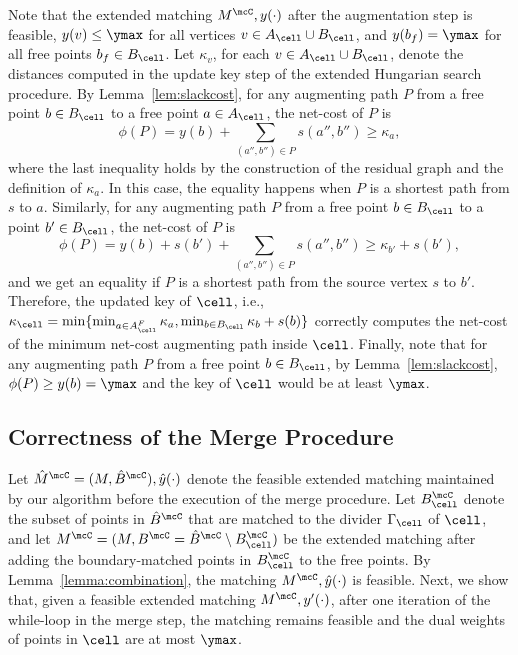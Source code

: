  Note that the extended matching $M^\mcC, y(\cdot)$ after the augmentation step is feasible, $y(v)\le \ymax$ for all vertices $v\in A_\cell\cup B_\cell$, and $y(b_f)=\ymax$ for all free points $b_f\in B_\cell$. Let $\kappa_v$, for each $v\in A_\cell\cup B_\cell$, denote the distances computed in the update key step of the extended Hungarian search procedure. By Lemma~\ref{lem:slackcost}, for any augmenting path $P$ from a free point $b\in B_\cell$ to a free point $a\in A_\cell$, the net-cost of $P$ is 
\[\phi(P)=y(b) +\sum_{(a'',b'')\in P}s(a'',b'') \ge \kappa_a,\] where the last inequality holds by the construction of the residual graph and the definition of $\kappa_a$. In this case, the equality happens when $P$ is a shortest path from $s$ to $a$. Similarly, for any augmenting path $P$ from a free point $b\in B_\cell$ to a point $b'\in B_\cell$, the net-cost of $P$ is 
\[\phi(P)=y(b) + s(b') +\sum_{(a'',b'')\in P}s(a'',b'') \ge \kappa_{b'} + s(b'),\]
and we get an equality if $P$ is a shortest path from the source vertex $s$ to $b'$.
Therefore, the updated key of $\cell$, i.e., $\kappa_\cell=\min\{\min_{a\in A_\cell^F}\kappa_a, \min_{b\in B_\cell}\kappa_b+s(b)\}$ correctly computes the net-cost of the minimum net-cost augmenting path inside $\cell$. Finally, note that for any augmenting path $P$ from a free point $b\in B_\cell$, by Lemma~\ref{lem:slackcost}, $\phi(P)\ge y(b)=\ymax$ and the key of $\cell$ would be at least $\ymax$.



\subsection{Correctness of the Merge Procedure}\label{subsec:merge_correctness}

\mergeProp*
Let $\hat{M}^\mcC=(M, \hat{B}^\mcC), \hat{y}(\cdot)$ denote the feasible extended matching maintained by our algorithm before the execution of the merge procedure. Let $B^\mcC_\cell$ denote the subset of points in $\hat{B}^\mcC$ that are matched to the divider $\Gamma_\cell$ of $\cell$, and let $M^\mcC=(M, B^\mcC = \hat{B}^\mcC\setminus B^\mcC_\cell)$ be the extended matching after adding the boundary-matched points in $B_\cell^\mcC$ to the free points. By Lemma~\ref{lemma:combination}, the matching $M^\mcC, \hat{y}(\cdot)$ is feasible. Next, we show that, given a feasible extended matching $M^\mcC, y'(\cdot)$, after one iteration of the while-loop in the merge step, the matching remains feasible and the dual weights of points in $\cell$ are at most $\ymax$.

